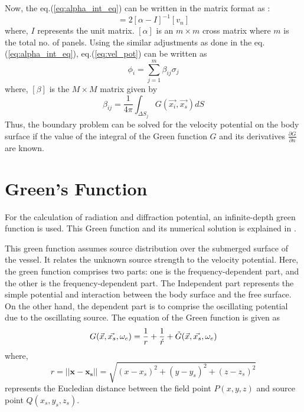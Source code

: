 Now, the eq.(\ref{eq:alpha_int_eq}) can be written in the matrix format as :
\begin{equation}
    [\sigma] = 2[\alpha - I]^{-1}[v_n]
\end{equation}
where, $I$ represents the unit matrix. $[\alpha]$ is an $m\times m$ cross matrix where $m$ is the total no. of panels. Using the similar adjustments as done in the eq.(\ref{eq:alpha_int_eq}), eq.(\ref{eq:vel_pot}) can be written as
\begin{equation}
    \phi_i = \sum_{j=1}^{m}\beta_{ij}\sigma_{j}
\end{equation}
where, $[\beta]$ is the $M\times M$ matrix given by
\begin{equation}
    \beta_{ij} = \frac{1}{4\pi}\int_{\Delta S_j}G(\Vec{x_i}, \vec{x_s}) dS  
\end{equation}
Thus, the boundary problem can be solved for the velocity potential on the body surface if the value of the integral of the Green function $G$ and its derivatives $\frac{\partial G}{\partial n}$ are known.
\section{Green's Function}
\label{sec:green_fun}
For the calculation of radiation and diffraction potential, an infinite-depth green function is used. This Green function and its numerical solution is explained in \cite{telste1986numerical}. 

This green function assumes source distribution over the submerged surface of the vessel. It relates the unknown source strength to the velocity potential. Here, the green function comprises two parts: one is the frequency-dependent part, and the other is the frequency-dependent part.  The Independent part represents the simple potential and interaction between the body surface and the free surface. On the other hand, the dependent part is to comprise the oscillating potential due to the oscillating source.
The equation of the Green function is given as 
\begin{equation}
    G(\vec{x}, \vec{x_s}, \omega_e) = \frac{1}{r} + \frac{1}{\acute{r}} + \Tilde{G}(\vec{x}, \vec{x_s}, \omega_e) 
\end{equation}
where, 
\begin{equation}
    r = ||\boldsymbol{x} - \boldsymbol{x_s}|| = \sqrt{(x-x_s)^2+(y-y_s)^2+(z-z_s)^2}
\end{equation}
represents the Eucledian distance between the field point $P(x, y, z)$ and source point $Q(x_s, y_s, z_s)$.

